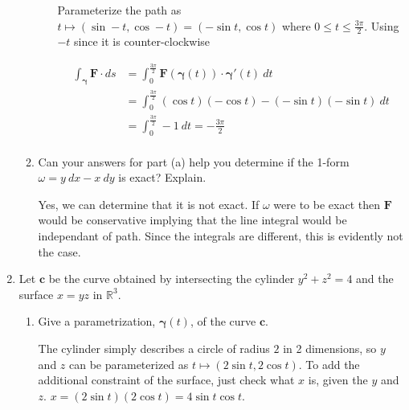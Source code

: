 \documentclass{article}
\newcommand{\gam}{\boldsymbol{\gamma}}
\begin{document}
\begin{enumerate}
\begin{enumerate}
\begin{enumerate}[label=(\roman*)]
                        Parameterize the path as $t \mapsto (\sin -t , \cos -t) = (-\sin t, \cos t)$ where $0 \leq t \leq \frac{3\pi}{2}$. Using $-t$ since it is counter-clockwise

                        \begin{align*}
                            \int_{\gam} \boldsymbol{F} \cdot ds &= \int^{\frac{3\pi}{2}}_0 \boldsymbol{F}(\gam(t)) \cdot \gam'(t) \ dt \\
                            &= \int^{\frac{3\pi}{2}}_0 (\cos t)(-\cos t) - (-\sin t)(-\sin t) \ dt \\
                            &= \int^{\frac{3\pi}{2}}_0 -1 \ dt = -\frac{3\pi}{2}\\
                        \end{align*}

                \end{enumerate}
            \item Can your answers for part (a) help you determine if the 1-form $\omega = y\ dx - x \ dy$ is exact? Explain.

                Yes, we can determine that it is not exact. If $\omega$ were to be exact then $\boldsymbol{F}$ would be conservative implying that the line integral would be independant of path. Since the integrals are different, this is evidently not the case.

        \end{enumerate}
    \newpage
    \item Let $\boldsymbol{c}$ be the curve obtained by intersecting the cylinder $y^2 + z^2 = 4$ and the surface $x=yz$ in $\mathbb{R}^3$.
        \begin{enumerate}
            \item Give a parametrization, $\gam (t)$, of the curve $\boldsymbol{c}$.

                The cylinder simply describes a circle of radius $2$ in 2 dimensions, so $y$ and $z$ can be parameterized as $t \mapsto (2 \sin t, 2 \cos t)$. To add the additional constraint of the surface, just check what $x$ is, given the $y$ and $z$. $x = (2\sin t)(2\cos t) = 4\sin t \cos t$.
               

\end{enumerate}
\end{enumerate}
\end{document}
